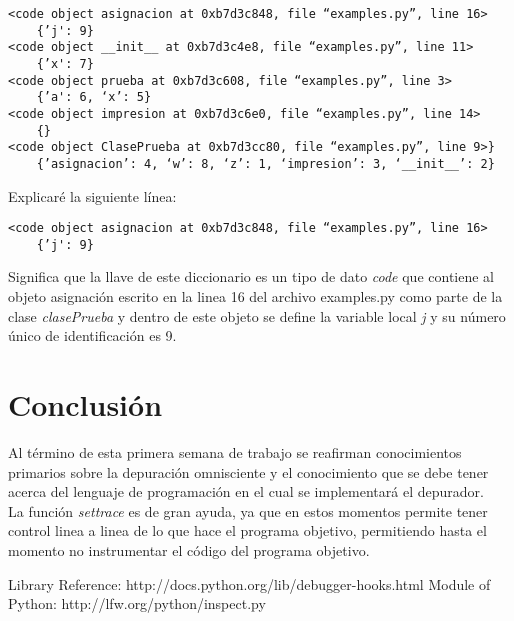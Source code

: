 \documentclass[10pt,a4paper]{article}
\begin{document}
\begin{verbatim}
<code object asignacion at 0xb7d3c848, file “examples.py”, line 16> 
    {’j': 9}
<code object __init__ at 0xb7d3c4e8, file “examples.py”, line 11> 
    {’x': 7}
<code object prueba at 0xb7d3c608, file “examples.py”, line 3> 
    {’a': 6, ‘x’: 5}
<code object impresion at 0xb7d3c6e0, file “examples.py”, line 14> 
    {}
<code object ClasePrueba at 0xb7d3cc80, file “examples.py”, line 9>}
    {’asignacion’: 4, ‘w’: 8, ‘z’: 1, ‘impresion’: 3, ‘__init__’: 2}
\end{verbatim}

Explicaré la siguiente línea:

\begin{verbatim}
<code object asignacion at 0xb7d3c848, file “examples.py”, line 16>
    {’j': 9}
\end{verbatim}

Significa que la llave de este diccionario es un tipo de dato \textit{code} que contiene al objeto asignación escrito en la linea 16 del archivo examples.py como parte de la clase \textit{clasePrueba} y dentro de este objeto se define la variable local \textit{j} y su número único de identificación es 9.

\pagebreak
\section{Conclusión}

Al término de esta primera semana de trabajo se reafirman conocimientos primarios sobre la depuración omnisciente y el conocimiento que se debe tener acerca del lenguaje de programación en el cual se implementará el depurador.\\

La función \textit{settrace} es de gran ayuda, ya que en estos momentos permite tener control linea a linea de lo que hace el programa objetivo, permitiendo hasta el momento no instrumentar el código del programa objetivo.


\begin{thebibliography}{1}
 Library Reference: http://docs.python.org/lib/debugger-hooks.html
 Module of Python: http://lfw.org/python/inspect.py
\end{thebibliography}
\end{document}
